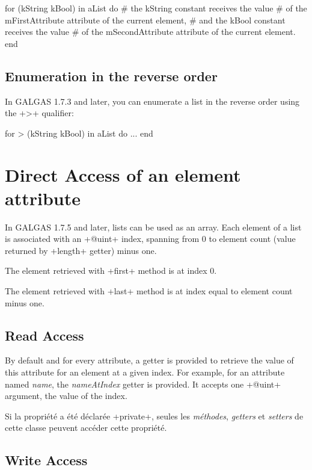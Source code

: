 \begin{galgas}
for (kString kBool) in aList do
  # the kString constant receives the value
  # of the mFirstAttribute attribute of the current element,
  # and the kBool constant receives the value
  # of the mSecondAttribute attribute of the current element.
end
\end{galgas}

\subsection{Enumeration in the reverse order}

In GALGAS 1.7.3 and later, you can enumerate a list in the reverse order using the \ggs+>+ qualifier:

\begin{galgas}
for > (kString kBool) in aList do
  ...
end
\end{galgas}




\section{Direct Access of an element attribute}

In GALGAS 1.7.5 and later, lists can be used as an array. Each element of a list is associated with an \ggs+@uint+ index, spanning from 0 to element count (value returned by \ggs+length+ getter) minus one.

The element retrieved with \ggs+first+ method is at index 0.

The element retrieved with \ggs+last+ method is at index equal to element count minus one.

\subsection{Read Access}

By default and for every attribute, a getter is provided to retrieve the value of this attribute for an element at a given index. For example, for an attribute named \emph{name}, the \emph{nameAtIndex} getter is provided. It accepts one \ggs+@uint+ argument, the value of the index.

Si la propriété a été déclarée \ggs+private+, seules les \emph{méthodes}, \emph{getters} et \emph{setters} de cette classe peuvent accéder cette propriété.



\subsection{Write Access}

